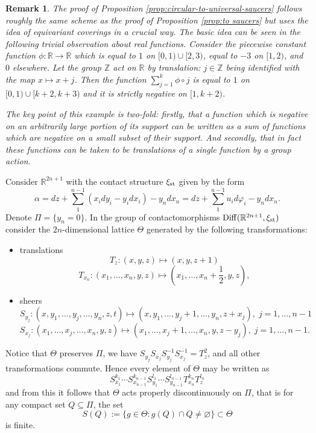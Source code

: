 \documentclass[12pt]{paper}
\theoremstyle{plain}
\newtheorem{remark}[theorem]{Remark}
\theoremstyle{definition}
\newcommand{\Z}{{\mathbb{Z}}}
\newcommand{\R}{{\mathbb{R}}}
\newcommand{\st}{{\rm st}}
\newcommand{\Diff}{\mathrm{Diff}}
\numberwithin{figure}{section}
\begin{document}
\begin{remark}  {\rm
  The proof of  Proposition  \ref{prop:circular-to-universal-saucers} follows roughly the same scheme as the proof of Proposition 
   \ref{prop:to saucers}
  but uses the idea of equivariant coverings in a crucial way. The basic idea can be seen in the following trivial observation about real functions. Consider the piecewise constant function $\phi: \R \to \R$ which is equal to $1$ on $[0,1) \cup [2,3)$, equal to $-3$ on $[1,2)$, and $0$ elsewhere. Let the group $\Z$ act on $\R$ by translation: $j \in \Z$ being identified with the map $x \mapsto x + j$. Then the function $\sum\limits_{j=1}^k \phi \circ j$ is equal to $1$ on $[0,1) \cup [k+2, k+3)$ and it is strictly negative on $[1,k+2)$.
  
The key point of this example is two-fold: firstly, that a function which is negative on an arbitrarily large portion of its support can be written as a sum of functions which are negative on a small subset of their support. And secondly, that in fact these functions can be taken to be translations of a single function by a group action.}
\end{remark}
 
  Consider $\R^{2n+1}$ with the contact structure $\xi_\st$ given by the form
  $$\alpha=dz+\sum\limits_1^{n-1}(x_idy_i-y_idx_i)-y_ndx_n = dz + \sum\limits_1^{n-1}u_id\varphi_i - y_ndx_n.$$
  Denote $\Pi=\{y_n=0\}$.
  In the group of contactomorphisms $\Diff(\R^{2n+1},\xi_\st)$ consider the $2n$-dimensional lattice  $\Theta$ generated by the following transformations:
  \begin{itemize}
  \item translations  
  $$T_z:  (x, y,z)\mapsto (x , y,z+1)$$ $$T_{x_n}: (x_1,\dots, x_n , y ,z)\mapsto (x_1,\dots, x_n+\frac12, y, z),$$
    \item sheers
 $$S_{y_j}:(x , y_1,\dots, y_j,\dots, y_{n},z,t)\mapsto (x , y_1,\dots, y_j+1,\dots, y_{n},z+x_j),\; j=1,\dots, n-1$$
 $$S_{x_j}:(x_1,\dots, x_j,\dots, x_n , y ,z)\mapsto (x_1,\dots, x_j+1,\dots, x_n , y,   z-y_j),\; j=1,\dots, n-1.$$
 \end{itemize}

 Notice that $\Theta$ preserves $\Pi$, we have 
 $S_{y_j}S_{x_j}S_{y_j}^{-1}S_{x_j}^{-1} = T_z^2$, and all other transformations commute.
 Hence every element of $\Theta$ may be written as
 $$
 	S_{x_1}^{k_1} \cdots S_{x_{n-1}}^{k_{n-1}}
	S_{y_1}^{l_1} \cdots S_{y_{n-1}}^{l_{n-1}}
	T_{x_n}^{k_n}T_{z}^{l_n}
 $$
 and from this it follows that $\Theta$ acts properly discontinuously on $\Pi$, that is
for any compact set $Q \subseteq \Pi$, the set
 \begin{equation}\label{eq:SQ}
S(Q):=\{g\in\Theta: g(Q)\cap Q\neq\varnothing\}\subset\Theta
\end{equation}
 is finite.  
 
\end{document}
